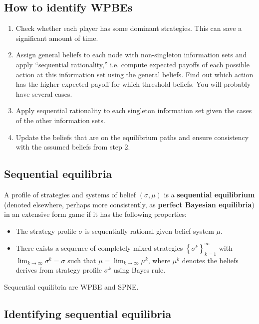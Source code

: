 \documentclass[10pt]{article}
\begin{document}
\begin{spacing}{1.0}
\subsection{How to identify WPBEs}

\begin{enumerate}
\item Check whether each player has some dominant strategies. This can save
  a significant amount of time.
\item Assign general beliefs to each node with non-singleton information
  sets and apply ``sequential rationality,'' i.e. compute expected payoffs
  of each possible action at this information set using the general
  beliefs. Find out which action has the higher expected payoff for which
  threshold beliefs. You will probably have several cases.
\item Apply sequential rationality to each singleton information set given
  the cases of the other information sets.
\item Update the beliefs that are on the equilibrium paths and ensure
  consistency with the assumed beliefs from step 2.
\end{enumerate}

\subsection{Sequential equilibria}

\begin{definition}
  A profile of strategies and systems of belief $(\sigma, \mu)$ is a
  \textbf{sequential equilibrium} (denoted elsewhere, perhaps more
  consistently, as \textbf{perfect Bayesian equilibria}) in an extensive
  form game if it has the following properties:
  \begin{itemize}
  \item The strategy profile $\sigma$ is sequentially rational given belief
    system $\mu$.
  \item There exists a sequence of completely mixed strategies
    $\left\{\sigma^k\right\}_{k=1}^\infty$ with $\lim_{k \to \infty} \sigma^k =
    \sigma$ such that $\mu = \lim_{k \to \infty} \mu^k$, where $\mu^k$ denotes
    the beliefs derives from strategy profile $\sigma^k$ using Bayes rule.
  \end{itemize}
\end{definition}

Sequential equilibria are WPBE and SPNE.

\subsection{Identifying sequential equilibria}


\end{spacing}
\end{document}
